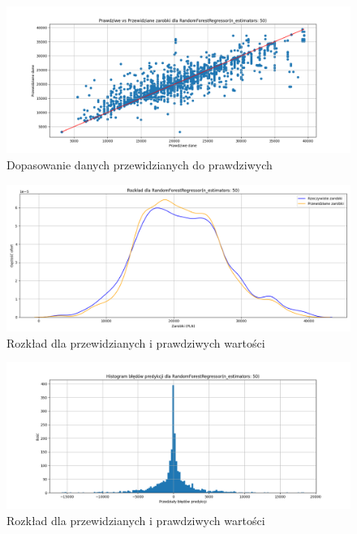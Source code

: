 \documentclass[a4paper]{article}
\begin{document}
\begin{figure}[H]
    \centering
    \includegraphics[width=\textwidth]{../analysis/plots/wyniki/0.6&0.4/RandomForestRegressor/scatter.png}
    \caption{Dopasowanie danych przewidzianych do prawdziwych}
\end{figure}

\begin{figure}[H]
    \centering
    \includegraphics[width=\textwidth]{../analysis/plots/wyniki/0.6&0.4/RandomForestRegressor/salary_dist.png}
    \caption{Rozkład dla przewidzianych i prawdziwych wartości}
\end{figure}

\begin{figure}[H]
    \centering
    \includegraphics[width=\textwidth]{../analysis/plots/wyniki/0.6&0.4/RandomForestRegressor/errors.png}
    \caption{Rozkład dla przewidzianych i prawdziwych wartości}
\end{figure}
\end{document}
